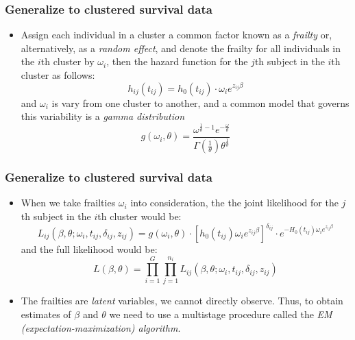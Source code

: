 \documentclass{beamer}
\newcommand{\empr}[1]{{\emph{\color{red}#1}}}
\begin{document}
\pagebreak
\begin{frame}
\frametitle{Generalize to clustered survival data}
\begin{itemize}
\item Assign each individual in a cluster a common factor known as a \empr{frailty} or, alternatively, as a \empr{random effect}, and denote the frailty for all individuals in the $i$th cluster by $\omega_i$, then the hazard function for the $j$th subject in the $i$th cluster as follows:
\begin{equation}
h_{ij}(t_{ij}) = h_0(t_{ij})\cdot \omega_i	e^{z_{ij}\beta}
\end{equation}
and $\omega_i$ is vary from one cluster to another, and a common model that governs this variability is a \empr{gamma distribution}
\begin{equation}
g(\omega_i,\theta) = \frac{\omega^{\frac{1}{\theta}-1}e^{-\frac{\omega}{\theta}}}{\Gamma(\frac{1}{\theta})\theta^{\frac{1}{\theta}}}
\end{equation}
\end{itemize}
\end{frame}


\pagebreak
\begin{frame}
\frametitle{Generalize to clustered survival data}
\begin{itemize}
\item When we take frailties $\omega_i$ into consideration, the the joint likelihood for the $j$th subject in the $i$th cluster would be:
\begin{equation}
L_{ij}(\beta,\theta;\omega_i,t_{ij},\delta_{ij},z_{ij}) = g(\omega_i,\theta)\cdot {[h_0(t_{ij})\omega_i e^{z_{ij}\beta}]}^{\delta_{ij}}\cdot e^{-H_0(t_{ij})\omega_i e^{z_{ij}\beta}}
\end{equation}
and the full likelihood would be:
\begin{equation}
L(\beta,\theta) = \prod\limits_{i=1}^{G}\prod\limits_{j=1}^{n_i}L_{ij}(\beta,\theta;\omega_i,t_{ij},\delta_{ij},z_{ij})
\end{equation}
\item The frailties are \empr{latent} variables, we cannot directly observe. Thus, to obtain estimates of $\beta$ and $\theta$ we need to use a multistage procedure called the \empr{EM (expectation-maximization) algorithm}.
\end{itemize}
\end{frame}
\end{document}
